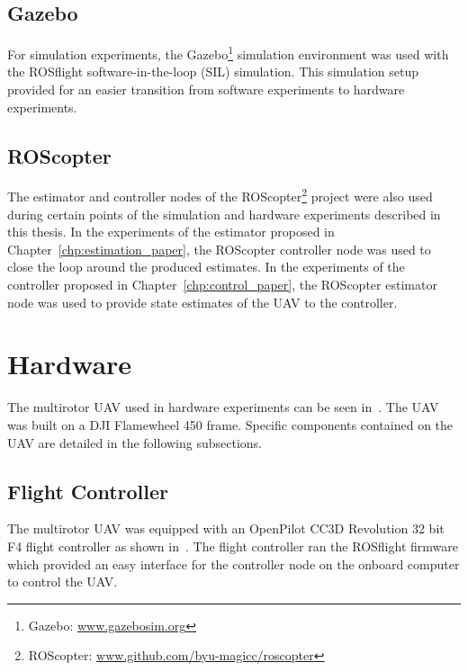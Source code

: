 \subsection {Gazebo}
For simulation experiments, the Gazebo\footnote{Gazebo:
\href{www.gazebosim.org}{www.gazebosim.org}} simulation environment was used with the ROSflight software-in-the-loop
(SIL) simulation.
This simulation setup provided for an easier transition from software
experiments to
hardware experiments.


\subsection {ROScopter}
The estimator and controller nodes of the ROScopter\footnote{ROScopter:
\href{www.github.com/byu-magicc/roscopter}{www.github.com/byu-magicc/roscopter}}
project were also used during certain points of the simulation and hardware
experiments described in this thesis. In the experiments of the estimator proposed in
Chapter~\ref{chp:estimation_paper}, the ROScopter controller node was used to
close the loop around the produced estimates. In the experiments of the 
controller proposed in Chapter~\ref{chp:control_paper}, the ROScopter estimator node
was used to provide state estimates of the UAV to the controller.

\section{Hardware}
The multirotor UAV used in hardware experiments can be seen
in~. The UAV was built on a DJI Flamewheel 450 frame.
Specific components contained on the UAV are detailed in the following
subsections.

\subsection{Flight Controller}
The multirotor UAV was equipped with an OpenPilot CC3D Revolution 32 bit F4
flight controller as shown in~. The flight controller ran the
ROSflight firmware which provided an easy interface
for the controller node on the onboard computer to control the UAV.

